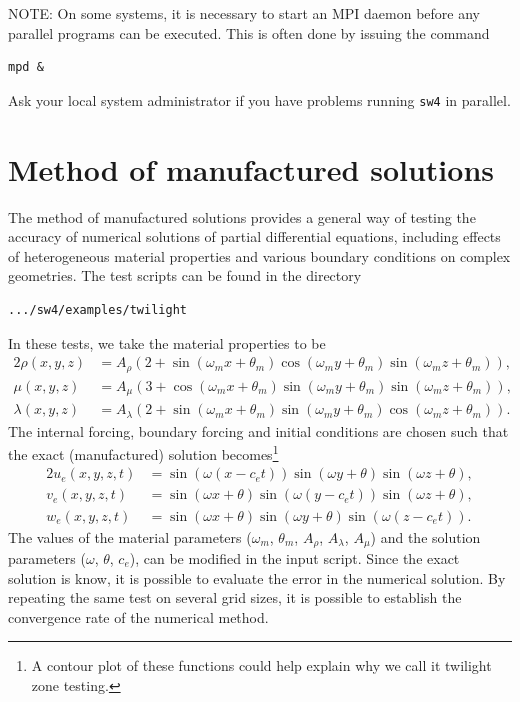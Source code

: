 \documentclass[11pt]{report}
\begin{document}
{NOTE: On some systems, it is necessary to start an MPI daemon before any parallel programs can be
executed. This is often done by issuing the command
\begin{verbatim}
mpd &
\end{verbatim}
Ask your local system administrator if you have problems running \verb+sw4+ in parallel.

\section{Method of manufactured solutions}\label{sec:twilight}

The method of manufactured solutions provides a general way of testing the accuracy of numerical
solutions of partial differential equations, including effects of heterogeneous material properties
and various boundary conditions on complex geometries. The test scripts can be found in the
directory
\begin{verbatim}
.../sw4/examples/twilight
\end{verbatim}
In these tests, we take the material properties to be
\begin{alignat*}{2}
	\rho(x,y,z)    & = A_\rho \left( 2 + \sin(\omega_m x + \theta_m) \cos(\omega_m y + \theta_m)
	\sin(\omega_m z + \theta_m) \right),                                                             \\
	\mu(x,y,z)     & =  A_\mu \left( 3 + \cos(\omega_m x + \theta_m) \sin(\omega_m y + \theta_m)
	\sin(\omega_m z + \theta_m) \right),                                                             \\
	\lambda(x,y,z) & =  A_\lambda \left( 2 + \sin(\omega_m x + \theta_m) \sin(\omega_m y + \theta_m)
	\cos(\omega_m z + \theta_m) \right).
\end{alignat*}
The internal forcing, boundary forcing and initial conditions are chosen such that the exact
(manufactured) solution becomes\footnote{A contour plot of these functions could help explain why we
	call it twilight zone testing.}
\begin{alignat*}{2}
	u_e(x,y,z,t) & = \sin(\omega(x-c_e t)) \sin(\omega y + \theta) \sin(\omega z + \theta),    \\
	v_e(x,y,z,t) & = \sin(\omega x + \theta) \sin(\omega( y - c_e t)) \sin(\omega z + \theta), \\
	w_e(x,y,z,t) & = \sin(\omega x + \theta) \sin(\omega y + \theta) \sin(\omega( z - c_e t)).
\end{alignat*}
The values of the material parameters ($\omega_m$, $\theta_m$, $A_\rho$, $A_\lambda$, $A_\mu$) and
the solution parameters ($\omega$, $\theta$, $c_e$), can be modified in the input script. Since the
exact solution is know, it is possible to evaluate the error in the numerical solution. By repeating
the same test on several grid sizes, it is possible to establish the convergence rate of the
numerical method.

}
\end{document}

